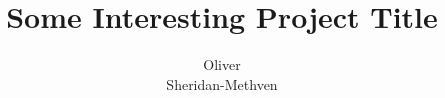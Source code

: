 \documentclass[a4paper, 10pt, english, oneside]{extarticle}
\author{Oliver\\Sheridan-Methven}
\title{Some Interesting Project Title}
\begin{document}
\maketitle 

\blindmathpaper 
\end{document}
